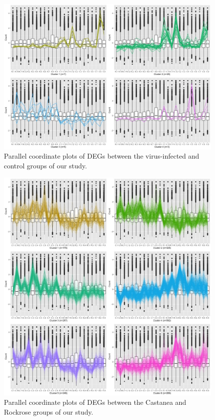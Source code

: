 \documentclass[11pt,a4paper,oldfontcommands,openany]{memoir}
\numberwithin{equation}{section} %
\begin{document}
\begin{figure}[H]
\centering
  \includegraphics[width=\textwidth]{../N_V/DESeq2/ClusterStandard/Clustering_data_FDR_05/N_V_4.jpg}
  \caption{Parallel coordinate plots of DEGs between the virus-infected and control groups of our study.}
  \label{fig:pcpRutterVirus}
\end{figure}

\begin{figure}[H]
  \includegraphics[width=\textwidth]{../C_R/DESeq2/ClusterStandard/Clustering_data_FDR_05/C_R_6.jpg}
  \caption{Parallel coordinate plots of DEGs between the Castanea and Rockrose groups of our study.}
  \label{fig:pcpRutterDiet}
\end{figure}
\end{document}

